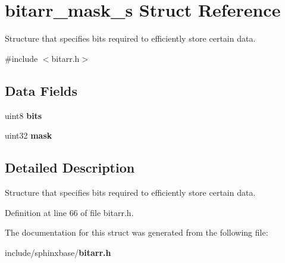 \section{bitarr\-\_\-mask\-\_\-s Struct Reference}
\label{structbitarr__mask__s}


Structure that specifies bits required to efficiently store certain data.  




{\ttfamily \#include $<$bitarr.\-h$>$}

\subsection*{Data Fields}
\begin{DoxyCompactItemize}
\item 
uint8 {\bfseries bits}\label{structbitarr__mask__s_a47b05f707efd5233f021bb1276c79b7a}

\item 
uint32 {\bfseries mask}\label{structbitarr__mask__s_a034b318c56cbc15befef989a2521623c}

\end{DoxyCompactItemize}


\subsection{Detailed Description}
Structure that specifies bits required to efficiently store certain data. 

Definition at line 66 of file bitarr.\-h.



The documentation for this struct was generated from the following file\-:\begin{DoxyCompactItemize}
\item 
include/sphinxbase/{\bf bitarr.\-h}\end{DoxyCompactItemize}
